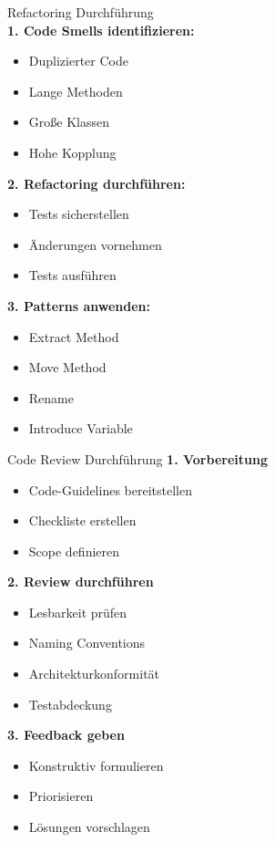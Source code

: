 \begin{KR}{Refactoring Durchführung}\\
\textbf{1. Code Smells identifizieren:}
\begin{itemize}
    \item Duplizierter Code
    \item Lange Methoden
    \item Große Klassen
    \item Hohe Kopplung
\end{itemize}

\textbf{2. Refactoring durchführen:}
\begin{itemize}
    \item Tests sicherstellen
    \item Änderungen vornehmen
    \item Tests ausführen
\end{itemize}

\textbf{3. Patterns anwenden:}
\begin{itemize}
    \item Extract Method
    \item Move Method
    \item Rename
    \item Introduce Variable
\end{itemize}
\end{KR}

\begin{KR}{Code Review Durchführung}
\textbf{1. Vorbereitung}
\begin{itemize}
    \item Code-Guidelines bereitstellen
    \item Checkliste erstellen
    \item Scope definieren
\end{itemize}

\textbf{2. Review durchführen}
\begin{itemize}
    \item Lesbarkeit prüfen
    \item Naming Conventions
    \item Architekturkonformität
    \item Testabdeckung
\end{itemize}

\textbf{3. Feedback geben}
\begin{itemize}
    \item Konstruktiv formulieren
    \item Priorisieren
    \item Lösungen vorschlagen
\end{itemize}
\end{KR}

